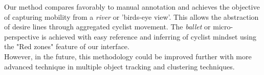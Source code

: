 Our method compares favorably to manual annotation and achieves the objective of capturing mobility
from a \textit{river} or 'birds-eye view'. This allows the abstraction of desire lines through aggregated cyclist movement. 
The \textit{ballet} or micro-perspective is achieved with easy reference and 
inferring of cyclist mindset using the "Red zones" feature of our interface.
\ \\

However, in the future, this methodology could be improved further with more advanced technique in 
multiple object tracking and clustering techniques.